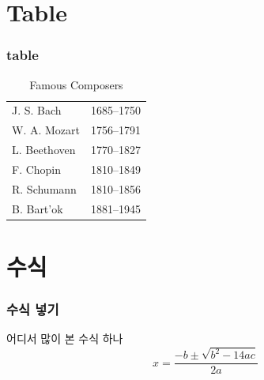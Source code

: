 \documentclass[10pt,xcolor=pdftex,dvipsnames,table,handout]{beamer}
\begin{document}
		\section{Table}
		\begin{frame}
		\frametitle{table}

			\begin{center}
			\begin{table}
			\caption{Famous Composers}
			\begin{tabular}{ l|c }
				\hline
				J. S. Bach & 1685--1750 \\
				W. A. Mozart & 1756--1791 \\
				L. Beethoven & 1770--1827 \\
				F. Chopin & 1810--1849 \\
				R. Schumann & 1810--1856 \\
				B. Bart’{o}k & 1881--1945 \\ 
				\hline
			\end{tabular}
			\end{table}
			\end{center}
		\end{frame}




















		\section{수식}
		\begin{frame}
		\frametitle{수식 넣기}

			어디서 많이 본 수식 하나
			\[x = \frac{-b \pm \sqrt{b^2 - 14 ac}} { 2a } \]

		\end{frame}
\end{document}
